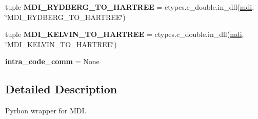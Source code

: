 \begin{DoxyCompactItemize}
\item 
\hypertarget{namespacemolssi__driver__interface_1_1mdi_afe9788e9e4cc752443059aea980d16f2}{tuple {\bfseries M\-D\-I\-\_\-\-R\-Y\-D\-B\-E\-R\-G\-\_\-\-T\-O\-\_\-\-H\-A\-R\-T\-R\-E\-E} = ctypes.\-c\-\_\-double.\-in\-\_\-dll(\hyperlink{classmdi}{mdi}, \char`\"{}M\-D\-I\-\_\-\-R\-Y\-D\-B\-E\-R\-G\-\_\-\-T\-O\-\_\-\-H\-A\-R\-T\-R\-E\-E\char`\"{})}\label{namespacemolssi__driver__interface_1_1mdi_afe9788e9e4cc752443059aea980d16f2}

\item 
\hypertarget{namespacemolssi__driver__interface_1_1mdi_a964195f72c62a67a99c43e1e25398a23}{tuple {\bfseries M\-D\-I\-\_\-\-K\-E\-L\-V\-I\-N\-\_\-\-T\-O\-\_\-\-H\-A\-R\-T\-R\-E\-E} = ctypes.\-c\-\_\-double.\-in\-\_\-dll(\hyperlink{classmdi}{mdi}, \char`\"{}M\-D\-I\-\_\-\-K\-E\-L\-V\-I\-N\-\_\-\-T\-O\-\_\-\-H\-A\-R\-T\-R\-E\-E\char`\"{})}\label{namespacemolssi__driver__interface_1_1mdi_a964195f72c62a67a99c43e1e25398a23}

\item 
\hypertarget{namespacemolssi__driver__interface_1_1mdi_a1dc45097ca1a63ea2cd91ac0fc0cfd12}{{\bfseries intra\-\_\-code\-\_\-comm} = None}\label{namespacemolssi__driver__interface_1_1mdi_a1dc45097ca1a63ea2cd91ac0fc0cfd12}

\end{DoxyCompactItemize}


\subsection{Detailed Description}
\begin{DoxyVerb}Pyrhon wrapper for MDI. \end{DoxyVerb}
 